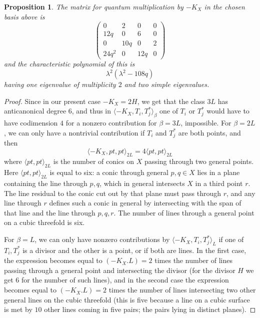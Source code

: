 \documentclass[11pt]{amsart}
\theoremstyle{plain}
\newtheorem{proposition}[theorem]{Proposition}
\numberwithin{equation}{section}
\theoremstyle{definition}
\theoremstyle{remark}
\begin{document}
\begin{proposition}\label{p:CubicThreefold}
The matrix for quantum multiplication by $-K_X$ in the chosen basis above is 
\[
\begin{pmatrix}
0 & 2 & 0 & 0 \\
12q & 0 & 6 & 0 \\
0 & 10q & 0 & 2\\
24q^2 & 0 & 12q & 0
\end{pmatrix}
\]
and the characteristic polynomial of this is 
\[
\lambda^2 (\lambda^2 -108q)
\]
having one eigenvalue of multiplicity $2$ and two simple eigenvalues.
\end{proposition}

\begin{proof}
 Since in our present case $-K_X = 2H$, we get that the class $3L$ has anticanonical degree $6$, and thus in $\langle -K_X, T_i, T_j^* \rangle_{\beta}$ one of $T_i$ or $T_j^*$ would have to have codimension $4$ for a nonzero contribution for $\beta=3L$, impossible. For $\beta=2L$, we can only have a nontrivial contribution if $T_i$ and $T_j^*$ are both points, and then 
\[
\langle -K_X , pt, pt \rangle_{2L} = 4 \langle pt, pt \rangle_{2L}
\]
where $\langle pt, pt \rangle_{2L}$ is the number of conics on $X$ passing through two general points. Here $\langle pt, pt \rangle_{2L}$ is equal to six: a conic through general $p, q\in X$ lies in a plane containing the line through $p, q$, which in general intersects $X$ in a third point $r$. The line residual to the conic cut out by that plane must pass through $r$, and any line through $r$ defines such a conic in general by intersecting with the span of that line and the line through $p,q,r$. The number of lines through a general point on a cubic threefold is six. 

For $\beta=L$, we can only have nonzero contributions by $\langle -K_X , T_i, T_j^* \rangle_{L}$ if one of $T_i, T_j^*$ is a divisor and the other is a point, or if both are lines. In the first case, the expression becomes equal to $(-K_X.L)=2$ times the number of lines passing through a general point and intersecting the divisor (for the divisor $H$ we get $6$ for the number of such lines), and in the second case the expression becomes equal to $(-K_X.L)=2$ times the number of lines intersecting two other general lines on the cubic threefold (this is five because a line on a cubic surface is met by $10$ other lines coming in five pairs; the pairs lying in distinct planes).  

\end{proof}
\end{document}
